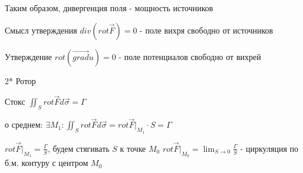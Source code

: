 \documentclass[12pt]{article}
\begin{document}
    Таким образом, дивергенция поля - мощность источников

    \Nota Смысл утверждения $div (rot \overrightarrow F) = 0$ - поле вихря свободно от источников

    \Nota Утверждение $rot (\overrightarrow{grad} u) = 0$ - поле потенциалов свободно от вихрей

    \vspace{5mm}

    2* Ротор

    Стокс $\displaystyle \iint_S rot \overrightarrow{F} d\overrightarrow{\sigma} = \Gamma$

    \Ths о среднем: $\displaystyle \exists M_1 : \iint_S rot \overrightarrow{F} d\overrightarrow{\sigma} = rot \overrightarrow{F} \Big|_{M_1} \cdot S = \Gamma$

    $\displaystyle rot \overrightarrow{F} \Big|_{M_1} = \frac{\Gamma}{S}$, будем стягивать $S$ к точке $\displaystyle M_0$ \Longrightarrow $\displaystyle rot \overrightarrow{F} \Big|_{M_0} = \lim_{S \to 0} \frac{\Gamma}{S}$ - циркуляция по б.м. контуру с центром $\displaystyle M_0$
\end{document}

